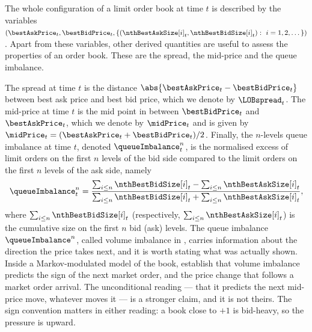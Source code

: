 The whole configuration of a limit order book at time $t$ is described by the variables
$(\bestAskPrice_t, \bestBidPrice_t, \lbrace (\nthBestAskSize[i]_t, \nthBestBidSize[i]_t) : \, \, i=1,2,\dots\rbrace)$.
Apart from these variables,
other derived quantities are useful to assess the properties of an order book.
These are the spread, the mid-price and the queue imbalance.

The spread at time $t$ is the distance $\abs{\bestAskPrice_t - \bestBidPrice_t}$
between best ask price and best bid price,
which we denote by $\LOBspread_t$.
The mid-price at time $t$ is the mid point in between $\bestBidPrice_t$ and $\bestAskPrice_{t}$,
which we denote by $\midPrice_t$ and is given by
$\midPrice_t = (\bestAskPrice_t + \bestBidPrice_{t})/{2}$.
Finally, the $n$-levels queue imbalance at time $t$,
denoted $\queueImbalance^{n}_t$,
is the normalised excess of limit orders on the first $n$ levels of the bid side
compared to the limit orders on the first $n$ levels of the ask side, namely
\begin{equation}
\label{eq.queueImbalance}
\queueImbalance^{n}_t =
\frac{\sum_{i\leq n}\nthBestBidSize[i]_t - \sum_{i\leq n}\nthBestAskSize[i]_t}{\sum_{i\leq n}\nthBestBidSize[i]_t + \sum_{i\leq n}\nthBestAskSize[i]_t},
\end{equation}
where $\sum_{i\leq n}\nthBestBidSize[i]_t$
(respectively, $\sum_{i\leq n}\nthBestAskSize[i]_t$)
is the cumulative size on the first $n$ bid (ask) levels.
The queue imbalance $\queueImbalance^n$, called volume imbalance in \cite{CDJ18enh},
carries information about the direction the price takes next,
and it is worth stating what was actually shown.
Inside a Markov-modulated model of the book,
\cite{CDJ18enh} establish that volume imbalance predicts the sign of the next market order,
and the price change that follows a market order arrival.
The unconditional reading --- that it predicts the next mid-price move, whatever moves it ---
is a stronger claim, and it is not theirs.
The sign convention matters in either reading:
a book close to $+1$ is bid-heavy, so the pressure is upward.

